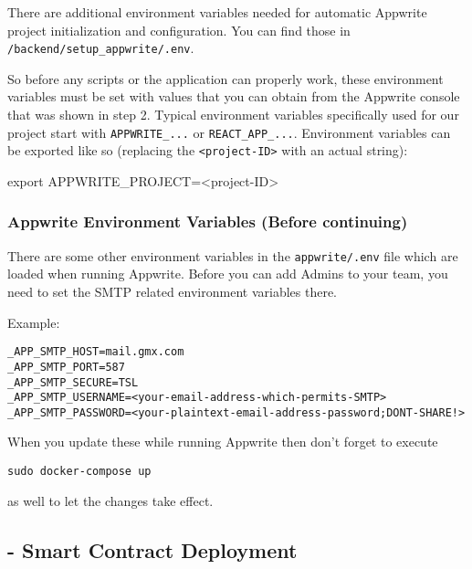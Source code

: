 \documentclass[
]{article}
\newenvironment{Shaded}{}{}
\newcommand{\BuiltInTok}[1]{#1}
\newcommand{\ExtensionTok}[1]{#1}
\newcommand{\OperatorTok}[1]{\textcolor[rgb]{0.40,0.40,0.40}{#1}}
\newcommand{\VariableTok}[1]{\textcolor[rgb]{0.10,0.09,0.49}{#1}}
\begin{document}
There are additional environment variables needed for automatic Appwrite
project initialization and configuration. You can find those in
\texttt{/backend/setup\_appwrite/.env}.

So before any scripts or the application can properly work, these
environment variables must be set with values that you can obtain from
the Appwrite console that was shown in step 2. Typical environment
variables specifically used for our project start with
\texttt{APPWRITE\_...} or \texttt{REACT\_APP\_...}. Environment
variables can be exported like so (replacing the
\texttt{\textless{}project-ID\textgreater{}} with an actual string):

\begin{Shaded}
\begin{Highlighting}[]
\BuiltInTok{export} \VariableTok{APPWRITE_PROJECT=}\OperatorTok{<}\ExtensionTok{project-ID}\OperatorTok{>}
\end{Highlighting}
\end{Shaded}

\hypertarget{appwrite-environment-variables-before-continuing}{%
\subsubsection{Appwrite Environment Variables (Before
continuing)}\label{appwrite-environment-variables-before-continuing}}

There are some other environment variables in the \texttt{appwrite/.env}
file which are loaded when running Appwrite. Before you can add Admins
to your team, you need to set the SMTP related environment variables
there.

Example:

\begin{verbatim}
_APP_SMTP_HOST=mail.gmx.com
_APP_SMTP_PORT=587
_APP_SMTP_SECURE=TSL
_APP_SMTP_USERNAME=<your-email-address-which-permits-SMTP>
_APP_SMTP_PASSWORD=<your-plaintext-email-address-password;DONT-SHARE!>
\end{verbatim}

When you update these while running Appwrite then don't forget to
execute

\begin{verbatim}
sudo docker-compose up
\end{verbatim}

as well to let the changes take effect.

\hypertarget{smart-contract-deployment}{%
\subsection{- Smart Contract
Deployment}\label{smart-contract-deployment}}
\end{document}
